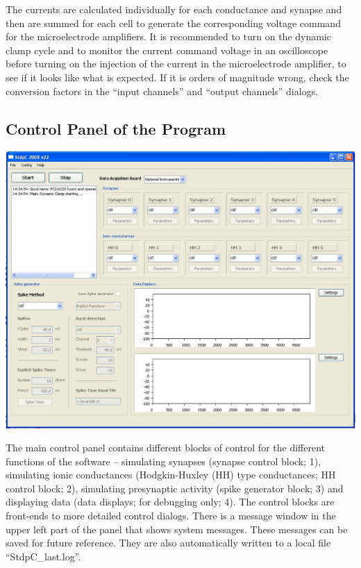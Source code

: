 \documentclass{article}
\begin{document}
The currents are calculated individually for each conductance and
synapse and then are summed for each cell to generate the
corresponding voltage command for the microelectrode amplifiers. It is
recommended to turn on the dynamic clamp cycle and to monitor the
current command voltage in an oscilloscope before turning on the
injection of the current in the microelectrode amplifier, to see if it
looks like what is expected. If it is orders of magnitude wrong, check
the conversion factors in the ``input channels'' and ``output
channels'' dialogs.

 
\subsection{Control Panel of the Program}

\parbox{\textwidth}{
  \includegraphics[width=\textwidth]{main}
}
\vspace*{0.5cm}

The main control panel contains different blocks of control for the
different functions of the software -- simulating synapses (synapse
control block; 1), simulating ionic conductances (Hodgkin-Huxley (HH)
type conductances; HH control block; 2), simulating presynaptic
activity (spike generator block; 3) and displaying data (data
displays; for debugging only; 4). The control blocks are front-ends to
more detailed control dialogs. There is a message window in the upper
left part of the panel that shows system messages. These messages can
be saved for future reference. They are also automatically written to
a local file ``StdpC\_last.log''.
\end{document}
